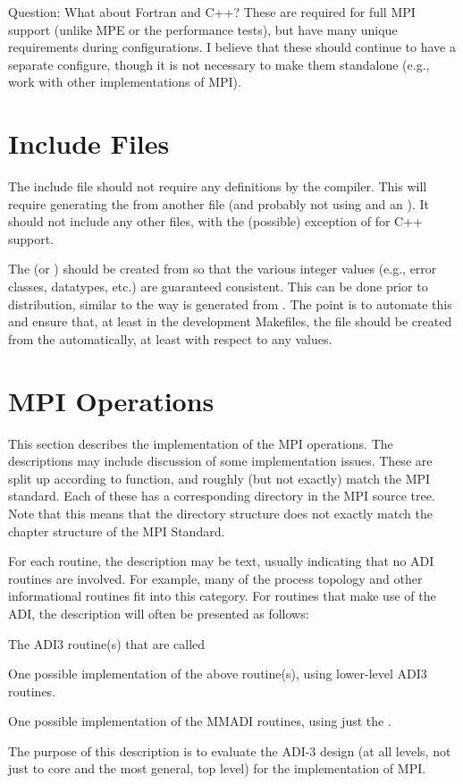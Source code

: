 \documentclass{article}
\begin{document}
Question: What about Fortran and C++?  These are required for full MPI support
(unlike MPE or the performance tests), but have many unique requirements
during configurations.  I believe that these should continue to have a
separate configure, though it is not necessary to make them standalone (e.g.,
work with other implementations of MPI).

\section{Include Files}
The include file  should not require any 
definitions by the compiler.  This will require generating the
 from another file (and probably not using  and an
).  It should not include any other
files, with the (possible) exception of  for C++
support.

The  (or ) should be created from
 so that the various integer values (e.g., error classes,
datatypes, etc.) are guaranteed consistent.  This can be done prior to
distribution, similar to the way  is generated from
.  The point is to automate this and ensure that,
at least in the development Makefiles, the  file
should be created from the  automatically, at least with
respect to any values. 

\section{MPI Operations}
\label{sec:mpi-operations}
This section describes the implementation of the MPI operations.  The
descriptions may include discussion of some implementation issues.
These are split up according to function, and roughly (but not
exactly) match the MPI standard.  Each of these has a corresponding
directory in the MPI source tree.  Note that this means that the
directory structure does not exactly match the chapter structure of
the MPI Standard.

For each routine, the description may be text, usually indicating that no ADI
routines are involved.  For example, many of the process topology and other
informational routines fit into this category.
For routines that make use of the ADI, the description will often be presented
as follows:
\begin{adi3}The ADI3 routine(s) that are called
\begin{mmadi}One possible implementation of the above routine(s), using
  lower-level ADI3 routines.
\begin{core}One possible implementation of the MMADI routines, using just the
  . 
\end{core}
\end{mmadi}
\end{adi3}
The purpose of this description is to evaluate the ADI-3 design (at all
levels, not just to core and the most general, top level) for the
implementation of MPI.  
\end{document}
